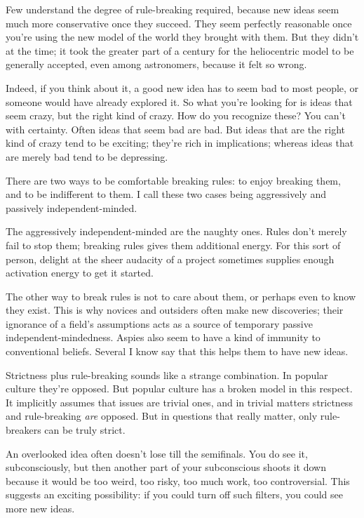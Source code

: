 Few understand the degree of rule-breaking required, because new ideas
seem much more conservative once they succeed. They seem perfectly
reasonable once you're using the new model of the world they brought
with them. But they didn't at the time; it took the greater part of a
century for the heliocentric model to be generally accepted, even among
astronomers, because it felt so wrong.

Indeed, if you think about it, a good new idea has to seem bad to most
people, or someone would have already explored it. So what you're
looking for is ideas that seem crazy, but the right kind of crazy. How
do you recognize these? You can't with certainty. Often ideas that seem
bad are bad. But ideas that are the right kind of crazy tend to be
exciting; they're rich in implications; whereas ideas that are merely
bad tend to be depressing.

There are two ways to be comfortable breaking rules: to enjoy breaking
them, and to be indifferent to them. I call these two cases being
aggressively and passively independent-minded.

The aggressively independent-minded are the naughty ones. Rules don't
merely fail to stop them; breaking rules gives them additional energy.
For this sort of person, delight at the sheer audacity of a project
sometimes supplies enough activation energy to get it started.

The other way to break rules is not to care about them, or perhaps even
to know they exist. This is why novices and outsiders often make new
discoveries; their ignorance of a field's assumptions acts as a source
of temporary passive independent-mindedness. Aspies also seem to have a
kind of immunity to conventional beliefs. Several I know say that this
helps them to have new ideas.

Strictness plus rule-breaking sounds like a strange combination. In
popular culture they're opposed. But popular culture has a broken model
in this respect. It implicitly assumes that issues are trivial ones, and
in trivial matters strictness and rule-breaking \emph{are} opposed. But
in questions that really matter, only rule-breakers can be truly strict.

An overlooked idea often doesn't lose till the semifinals. You do see
it, subconsciously, but then another part of your subconscious shoots it
down because it would be too weird, too risky, too much work, too
controversial. This suggests an exciting possibility: if you could turn
off such filters, you could see more new ideas.

